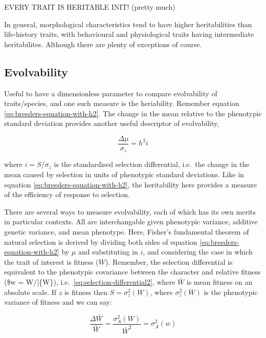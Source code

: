 \documentclass[
]{book}
\begin{document}
EVERY TRAIT IS HERITABLE INIT! (pretty much)

In general, morphological characteristics tend to have higher heritabilities than life-history traits, with behavioural and physiological traits having intermediate heritabilites. Although there are plenty of exceptions of course.

\hypertarget{evolvability}{%
\subsection{Evolvability}\label{evolvability}}

Useful to have a dimensionless parameter to compare evolvability of traits/species, and one such measure is the heriability. Remember equation \eqref{eq:breeders-equation-with-h2}. The change in the mean relative to the phenotypic standard deviation provides another useful descriptor of evolvability,

\begin{equation}
    \frac{\Delta\mu} {\sigma_z} = h^2i
    \label{eq:breeders-divided-by-phenotypic-sd}
\end{equation}

where \(i = S / \sigma_z\) is the standardised selection differential, i.e.~the change in the mean caused by selection in units of phenotypic standard deviations. Like in equation \eqref{eq:breeders-equation-with-h2}, the heritability here provides a measure of the efficiency of response to selection.

There are several ways to measure evolvability, each of which has its own merits in particular contexts. All are interchangable given phenotypic variance, additive genetic variance, and mean phenotype. Here, Fisher's fundamental theorem of natural selection is derived by dividing both sides of equation \eqref{eq:breeders-equation-with-h2} by \(\mu\) and substituting in \(i\), and considering the case in which the trait of interest is fitness (\(W\)). Remember, the selection differential is equivalent to the phenotypic covariance between the character and relative fitness (\$w = W/\bar\{W\}), i.e.~\eqref{eq:selection-differential2}, where \(\bar{W}\) is mean fitness on an absolute scale. If \(z\) is fitness then \(S = \sigma^2_z(W)\), where \(\sigma^2_z(W)\) is the phenotypic variance of fitness and we can say:

\begin{equation}
    \frac{\Delta\bar{W}} {\bar{W}} = \frac{\sigma^2_A(W)} {\bar{W}^2} = \sigma^2_A(w)
    \label{eq:fishers-fundamental-theorem-of-natural-selection}
\end{equation}
\end{document}
